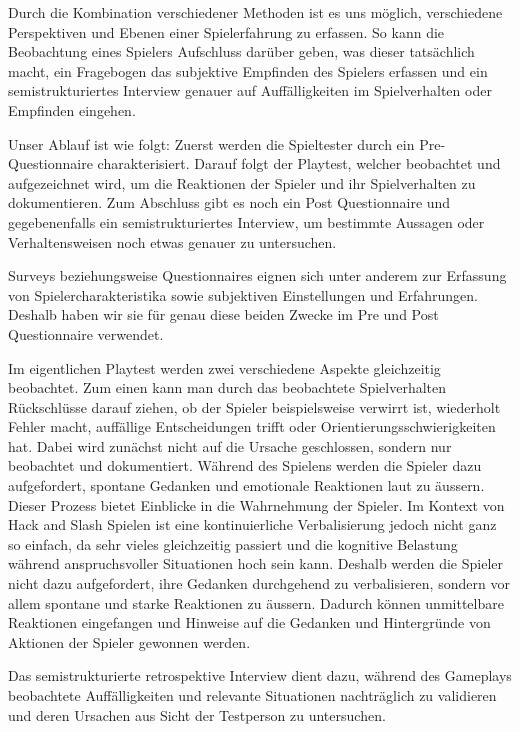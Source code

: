 \documentclass[../Main.tex]{subfiles}
\begin{document}
Durch die Kombination verschiedener Methoden ist es uns möglich, verschiedene Perspektiven und Ebenen einer Spielerfahrung zu erfassen. So kann die Beobachtung eines Spielers Aufschluss darüber geben, was dieser tatsächlich macht, ein Fragebogen das subjektive Empfinden des Spielers erfassen und ein semistrukturiertes Interview genauer auf Auffälligkeiten im Spielverhalten oder Empfinden eingehen.

Unser Ablauf ist wie folgt: Zuerst werden die Spieltester durch ein Pre-Questionnaire charakterisiert. Darauf folgt der Playtest, welcher beobachtet und aufgezeichnet wird, um die Reaktionen der Spieler und ihr Spielverhalten zu dokumentieren. Zum Abschluss gibt es noch ein Post Questionnaire und gegebenenfalls ein semistrukturiertes Interview, um bestimmte Aussagen oder Verhaltensweisen noch etwas genauer zu untersuchen.

Surveys beziehungsweise Questionnaires eignen sich unter anderem zur Erfassung von Spielercharakteristika sowie subjektiven Einstellungen und Erfahrungen. Deshalb haben wir sie für genau diese beiden Zwecke im Pre und Post Questionnaire verwendet.

Im eigentlichen Playtest werden zwei verschiedene Aspekte gleichzeitig beobachtet. Zum einen kann man durch das beobachtete Spielverhalten Rückschlüsse darauf ziehen, ob der Spieler beispielsweise verwirrt ist, wiederholt Fehler macht, auffällige Entscheidungen trifft oder Orientierungsschwierigkeiten hat. Dabei wird zunächst nicht auf die Ursache geschlossen, sondern nur beobachtet und dokumentiert. Während des Spielens werden die Spieler dazu aufgefordert, spontane Gedanken und emotionale Reaktionen laut zu äussern. Dieser Prozess bietet Einblicke in die Wahrnehmung der Spieler. Im Kontext von Hack and Slash Spielen ist eine kontinuierliche Verbalisierung jedoch nicht ganz so einfach, da sehr vieles gleichzeitig passiert und die kognitive Belastung während anspruchsvoller Situationen hoch sein kann. Deshalb werden die Spieler nicht dazu aufgefordert, ihre Gedanken durchgehend zu verbalisieren, sondern vor allem spontane und starke Reaktionen zu äussern. Dadurch können unmittelbare Reaktionen eingefangen und Hinweise auf die Gedanken und Hintergründe von Aktionen der Spieler gewonnen werden.

Das semistrukturierte retrospektive Interview dient dazu, während des Gameplays beobachtete Auffälligkeiten und relevante Situationen nachträglich zu validieren und deren Ursachen aus Sicht der Testperson zu untersuchen.
\end{document}
